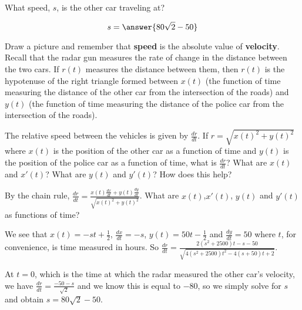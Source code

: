 \documentclass{ximera}
\begin{document}
\begin{exercise}
What speed, $s$, is the other car traveling at?
\begin{prompt}
  \[
  s=\answer{80\sqrt{2}-50}
  \]
\end{prompt}
\begin{hint}
Draw a picture and remember that \textbf{speed} is the absolute value of \textbf{velocity}. Recall that the radar gun measures the rate of change in the distance between the two cars. If $r(t)$ measures the distance between them, then $r(t)$ is the hypotenuse of the right triangle formed between $x(t)$ (the function of time measuring the distance of the other car from the intersection of the roads) and $y(t)$ (the function of time measuring the distance of the police car from the intersection of the roads). 
\end{hint}
\begin{hint}
The relative speed between the vehicles is given by $\frac{dr}{dt}$. If $r=\sqrt{x(t)^2+y(t)^2}$ where $x(t)$ is the position of the other car as a function of time and $y(t)$ is the position of the police car as a function of time, what is $\frac{dr}{dt}$? What are $x(t)$ and $x'(t)$? What are $y(t)$ and $y'(t)$? How does this help? 
\end{hint}
\begin{hint}
By the chain rule, $\frac{dr}{dt}=\frac{x(t)\frac{dx}{dt}+y(t)\frac{dy}{dt}}{\sqrt{x(t)^2+y(t)^2}}$. What are $x(t)$,$x'(t)$, $y(t)$ and $y'(t)$ as functions of time?
\end{hint}
\begin{hint}
We see that $x(t)=-st+\frac{1}{2}$, $\frac{dx}{dt}=-s$, $y(t)=50t-\frac{1}{2}$ and $\frac{dy}{dt}=50$ where $t$, for convenience, is time measured in hours. So $\frac{dr}{dt}=\frac{2(s^2+2500) t-s-50}{\sqrt{4(s^2+2500) t^2-4 (s+50) t+2}}$.
\end{hint}
\begin{hint}
At $t=0$, which is the time at which the radar measured the other car's velocity, we have $\frac{dr}{dt}=\frac{-50-s}{\sqrt{2}}$ and we know this is equal to $-80$, so we simply solve for $s$ and obtain $s=80\sqrt{2}-50$.\\


\end{hint}
\end{exercise}
\end{document}

